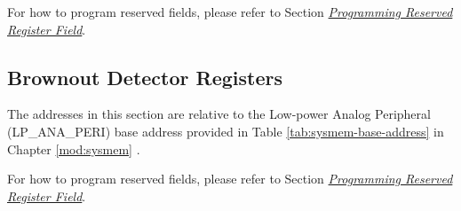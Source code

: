 \documentclass[main\_\_EN.tex]{subfiles}
\begin{document}
For how to program reserved fields, please refer to Section \hyperref[programming-reserved-field]{\textit{Programming Reserved Register Field}}.



\subsection{Brownout Detector Registers}

The addresses in this section are relative to the Low-power Analog Peripheral (LP\_ANA\_PERI) base address provided in Table \ref{tab:sysmem-base-address} in Chapter \ref{mod:sysmem} \textit{}.

For how to program reserved fields, please refer to Section \hyperref[programming-reserved-field]{\textit{Programming Reserved Register Field}}.


\end{document}
